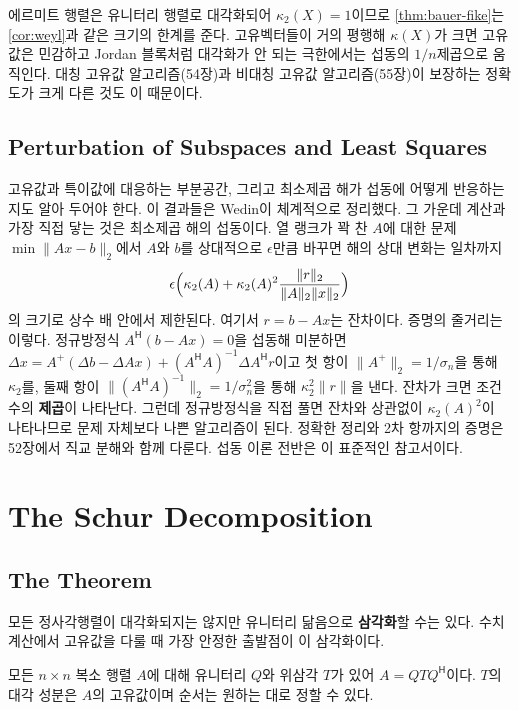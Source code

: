 에르미트 행렬은 유니터리 행렬로 대각화되어 $\kappa_2(X)=1$이므로 \cref{thm:bauer-fike}는 \cref{cor:weyl}과 같은 크기의 한계를 준다\cite{bauer1960fike}. 고유벡터들이 거의 평행해 $\kappa(X)$가 크면 고유값은 민감하고 Jordan 블록처럼 대각화가 안 되는 극한에서는 섭동의 $1/n$제곱으로 움직인다. 대칭 고유값 알고리즘(54장)과 비대칭 고유값 알고리즘(55장)이 보장하는 정확도가 크게 다른 것도 이 때문이다.

\subsection{Perturbation of Subspaces and Least Squares}

고유값과 특이값에 대응하는 부분공간, 그리고 최소제곱 해가 섭동에 어떻게 반응하는지도 알아 두어야 한다. 이 결과들은 Wedin이 체계적으로 정리했다\cite{wedin1972}. 그 가운데 계산과 가장 직접 닿는 것은 최소제곱 해의 섭동이다. 열 랭크가 꽉 찬 $A$에 대한 문제 $\min\|Ax-b\|_2$에서 $A$와 $b$를 상대적으로 $\epsilon$만큼 바꾸면 해의 상대 변화는 일차까지
\[
\epsilon\Bigl(\kappa_2(A)+\kappa_2(A)^2\frac{\|r\|_2}{\|A\|_2\|x\|_2}\Bigr)
\]
의 크기로 상수 배 안에서 제한된다. 여기서 $r=b-Ax$는 잔차이다. 증명의 줄거리는 이렇다. 정규방정식 $A^{\mathsf H}(b-Ax)=0$을 섭동해 미분하면 $\Delta x=A^+(\Delta b-\Delta Ax)+(A^{\mathsf H}A)^{-1}\Delta A^{\mathsf H}r$이고 첫 항이 $\|A^+\|_2=1/\sigma_n$을 통해 $\kappa_2$를, 둘째 항이 $\|(A^{\mathsf H}A)^{-1}\|_2=1/\sigma_n^2$을 통해 $\kappa_2^2\|r\|$을 낸다. 잔차가 크면 조건수의 \textbf{제곱}이 나타난다. 그런데 정규방정식을 직접 풀면 잔차와 상관없이 $\kappa_2(A)^2$이 나타나므로 문제 자체보다 나쁜 알고리즘이 된다. 정확한 정리와 2차 항까지의 증명은 52장에서 직교 분해와 함께 다룬다. 섭동 이론 전반은 \cite{stewart1990perturbation}이 표준적인 참고서이다.

\section{The Schur Decomposition}
\label{sec:schur}

\subsection{The Theorem}

모든 정사각행렬이 대각화되지는 않지만 유니터리 닮음으로 \textbf{삼각화}할 수는 있다. 수치 계산에서 고유값을 다룰 때 가장 안정한 출발점이 이 삼각화이다.

\begin{theorem}[Schur]
\label{thm:schur}
모든 $n\times n$ 복소 행렬 $A$에 대해 유니터리 $Q$와 위삼각 $T$가 있어 $A=QTQ^{\mathsf H}$이다. $T$의 대각 성분은 $A$의 고유값이며 순서는 원하는 대로 정할 수 있다.
\end{theorem}

